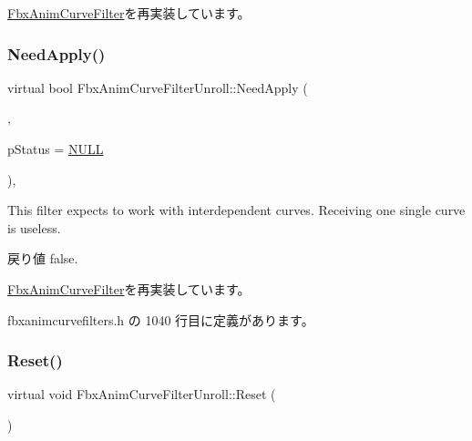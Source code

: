 \hyperlink{class_fbx_anim_curve_filter_a6b210eca45b745cf070c46bfaaf3e5b2}{Fbx\+Anim\+Curve\+Filter}を再実装しています。

\mbox{\label{class_fbx_anim_curve_filter_unroll_adbe1626e507eb312b994b38403a11a19}} 
\subsubsection{\texorpdfstring{Need\+Apply()}{NeedApply()}\hspace{0.1cm}{\footnotesize\ttfamily [5/5]}}
{\footnotesize\ttfamily virtual bool Fbx\+Anim\+Curve\+Filter\+Unroll\+::\+Need\+Apply (\begin{DoxyParamCaption}\item[{\hyperlink{class_fbx_anim_curve}{Fbx\+Anim\+Curve} \&}]{,  }\item[{\hyperlink{class_fbx_status}{Fbx\+Status} $\ast$}]{p\+Status = {\ttfamily \hyperlink{fbxarch_8h_a070d2ce7b6bb7e5c05602aa8c308d0c4}{N\+U\+LL}} }\end{DoxyParamCaption})\hspace{0.3cm}{\ttfamily [inline]}, {\ttfamily [virtual]}}

This filter expects to work with interdependent curves. Receiving one single curve is useless. \begin{DoxyReturn}{戻り値}
{\ttfamily false}. 
\end{DoxyReturn}


\hyperlink{class_fbx_anim_curve_filter_af768a9c47e4f5a5fff47a8ec781e6b4c}{Fbx\+Anim\+Curve\+Filter}を再実装しています。



 fbxanimcurvefilters.\+h の 1040 行目に定義があります。

\mbox{\label{class_fbx_anim_curve_filter_unroll_a0587dd664dddb98a809043f030b409d6}} 
\subsubsection{\texorpdfstring{Reset()}{Reset()}}
{\footnotesize\ttfamily virtual void Fbx\+Anim\+Curve\+Filter\+Unroll\+::\+Reset (\begin{DoxyParamCaption}{ }\end{DoxyParamCaption})\hspace{0.3cm}{\ttfamily [virtual]}}

